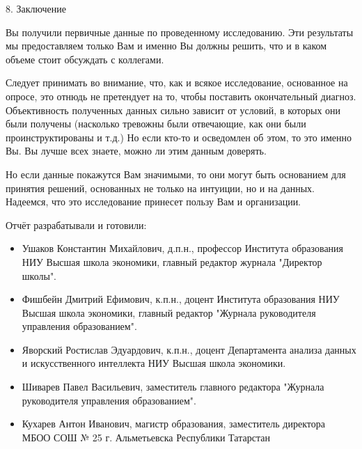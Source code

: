\begin{frame}{8. Заключение}

\tiny 
Вы получили первичные данные по проведенному исследованию. Эти результаты мы предоставляем только Вам и именно Вы должны решить, что и в каком объеме стоит обсуждать с коллегами. 
\smallskip

Следует принимать во внимание, что, как и всякое исследование, основанное на опросе, это отнюдь не претендует на то, чтобы поставить окончательный диагноз. Объективность полученных данных сильно зависит от условий, в которых они были получены (насколько тревожны были отвечающие, как они были проинструктированы и т.д.) Но если кто-то и осведомлен об этом, то это именно Вы.  Вы лучше всех знаете, можно ли этим данным доверять.
\smallskip

Но  если данные покажутся Вам значимыми, то они могут быть основанием для принятия решений, основанных не только на интуиции, но и на данных. Надеемся, что это исследование принесет пользу Вам и организации.


\end{frame}

\begin{frame}{}

\tiny 
Отчёт разрабатывали и готовили:

\begin{itemize}

\item Ушаков Константин Михайлович, д.п.н., профессор Института образования НИУ Высшая школа экономики, главный редактор журнала "Директор школы".

\item Фишбейн Дмитрий Ефимович, к.п.н., доцент Института образования НИУ Высшая школа экономики, главный редактор "Журнала руководителя управления образованием".

\item Яворский Ростислав Эдуардович, к.п.н., доцент Департамента анализа данных и искусственного интеллекта НИУ Высшая школа экономики.

\item Шиварев Павел Васильевич, заместитель главного редактора "Журнала руководителя управления образованием".

\item Кухарев Антон Иванович, магистр образования, заместитель директора МБОО СОШ № 25 г. Альметьевска Республики Татарстан

\end{itemize}

\end{frame}


